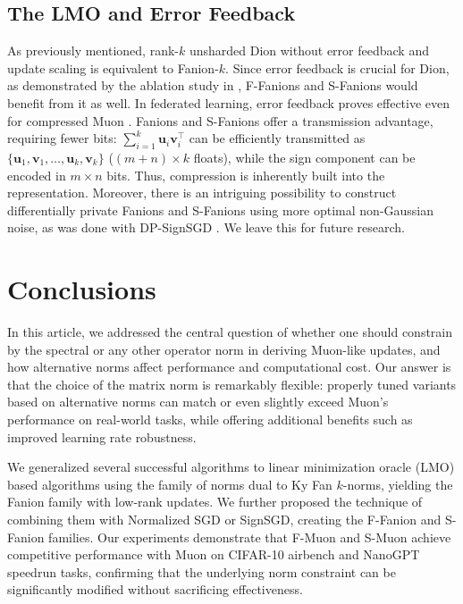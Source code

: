 \documentclass[smallextended,referee,envcountsect]{svjour3}
\def\vu{{\bm{u}}}
\def\vv{{\bm{v}}}
\begin{document}
 \subsection{The LMO and Error Feedback}
 
 As previously mentioned, rank-$k$ unsharded Dion without error feedback and update scaling is equivalent to Fanion-$k$. Since error feedback is crucial for Dion, as demonstrated by the ablation study in \citep{ahn2025dion}, F-Fanions and S-Fanions would benefit from it as well. In federated learning, error feedback proves effective even for compressed Muon \citep{gruntkowska2025efmuon}. Fanions and S-Fanions offer a transmission advantage, requiring fewer bits: $\sum_{i=1}^k \vu_i \vv_i^\top$ can be efficiently transmitted as $\{\vu_1, \vv_1, \dots, \vu_k, \vv_k\}$ ($(m+n)\times k$ floats), while the sign component can be encoded in $m \times n$ bits. Thus, compression is inherently built into the representation. Moreover, there is an intriguing possibility to construct differentially private Fanions and S-Fanions using more optimal non-Gaussian noise, as was done with DP-SignSGD \citep{jang2024dplogsign}. We leave this for future research.
 
 
 \section{Conclusions}

 In this article, we addressed the central question of whether one should constrain by the spectral or any other operator norm in deriving Muon-like updates, and how alternative norms affect performance and computational cost. Our answer is that the choice of the matrix norm is remarkably flexible: properly tuned variants based on alternative norms can match or even slightly exceed Muon's performance on real-world tasks, while offering additional benefits such as improved learning rate robustness.

 We generalized several successful algorithms to linear minimization oracle (LMO) based algorithms using the family of norms dual to Ky Fan $k$-norms, yielding the Fanion family with low-rank updates. We further proposed the technique of combining them with Normalized SGD or SignSGD, creating the F-Fanion and S-Fanion families. Our experiments demonstrate that F-Muon and S-Muon achieve competitive performance with Muon on CIFAR-10 airbench and NanoGPT speedrun tasks, confirming that the underlying norm constraint can be significantly modified without sacrificing effectiveness.
\end{document}
